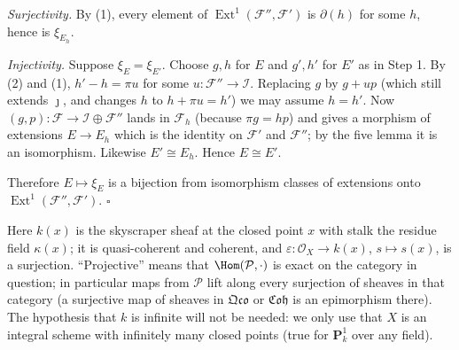 \documentclass[11pt]{article}
\begin{document}
\emph{Surjectivity.} By (1), every element of $\operatorname{Ext}^1(\mathcal F'',\mathcal F')$ is $\partial(h)$ for some $h$, hence is $\xi_{E_h}$.

\emph{Injectivity.} Suppose $\xi_E=\xi_{E'}$. Choose $g,h$ for $E$ and $g',h'$ for $E'$ as in Step 1. By (2) and (1), $h'-h=\pi u$ for some $u\colon\mathcal F''\to\mathcal I$. Replacing $g$ by $g+up$ (which still extends $\jmath$, and changes $h$ to $h+\pi u=h'$) we may assume $h=h'$. Now $(g,p)\colon\mathcal F\to\mathcal I\oplus\mathcal F''$ lands in $\mathcal F_h$ (because $\pi g=hp$) and gives a morphism of extensions $E\to E_h$ which is the identity on $\mathcal F'$ and $\mathcal F''$; by the five lemma it is an isomorphism. Likewise $E'\cong E_{h}$. Hence $E\cong E'$.

Therefore $E\mapsto\xi_E$ is a bijection from isomorphism classes of extensions onto $\operatorname{Ext}^1(\mathcal F'',\mathcal F')$. \hfill$\square$

\pf
Here $k(x)$ is the skyscraper sheaf at the closed point $x$ with stalk the residue field $\kappa(x)$; it is quasi-coherent and coherent, and $\varepsilon\colon\mathcal O_X\to k(x)$, $s\mapsto s(x)$, is a surjection. ``Projective'' means that $\Hom(\mathcal P,\cdot)$ is exact on the category in question; in particular maps from $\mathcal P$ lift along every surjection of sheaves in that category (a surjective map of sheaves in $\mathfrak{Qco}$ or $\mathfrak{Coh}$ is an epimorphism there). The hypothesis that $k$ is infinite will not be needed: we only use that $X$ is an integral scheme with infinitely many closed points (true for $\mathbf P^1_k$ over any field).
\end{document}
